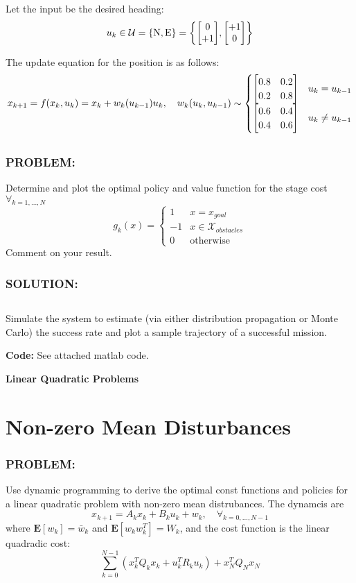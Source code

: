 \documentclass[]{article}
\newcommand{\Problem}{\subsubsection*{\textbf{PROBLEM:}}}
\newcommand{\Solution}{\subsubsection*{\textbf{SOLUTION:}}}
\begin{document}
Let the input be the desired heading:\[
    u_k \in \mathcal{U} = \qty{\text{N}, \text{E}} = \qty{\mqty[0\\+1], \mqty[+1\\0]}
\]

The update equation for the position is as follows:\[
    x_{k+1} = f(x_k,u_k) = x_k + w_k(u_{k-1}) u_{k}, 
    \quad w_k(u_{k},u_{k-1}) \sim \begin{cases}
        \mqty[0.8 & 0.2 \\ 0.2 & 0.8] & u_{k} = u_{k-1}\\
        \mqty[0.6 & 0.4 \\ 0.4 & 0.6] & u_{k} \neq u_{k-1}
    \end{cases}
\]

\subsection{}
\Problem
Determine and plot the optimal policy and value function for the stage cost $\forall_{k = 1,\dots, N}$ \[
    g_k(x) = \begin{cases}
        1 & x = x_{goal}\\%
        -1 & x \in \mathcal{X}_{obstacles}\\%
        0 & \text{otherwise}
    \end{cases}
\]
Comment on your result.
\Solution








\subsection{}
Simulate the system to estimate (via either distribution propagation or Monte Carlo) the success rate and plot a sample trajectory of a successful mission.








\textbf{Code:} See attached matlab code.


\newpage
\textbf{Linear Quadratic Problems}
\section{Non-zero Mean Disturbances}
\Problem
Use dynamic programming to derive the optimal const functions and policies for a linear quadratic problem with non-zero mean distrubances.
The dynamcis are \[
    x_{k+1} = A_k x_k + B_k u_k + w_k, \quad \forall_{k=0,\dots, N-1}
\] 
where $\mathbf{E} [w_k] = \bar{w}_k$ and $\mathbf{E}[w_k w_k^T] = W_k$, and the cost function is the linear quadradic cost: \[
    \sum_{k=0}^{N-1} (x_k^T Q_k x_k + u_k^T R_k u_k) + x_N^T Q_N x_N
\]
\end{document}
